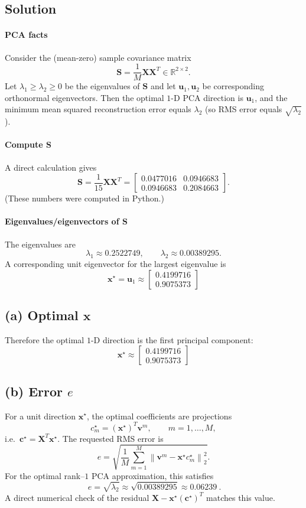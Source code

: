 \documentclass{article}
\begin{document}
\subsection*{Solution}

\paragraph{PCA facts}
Consider the (mean-zero) sample covariance matrix
\[
\mathbf S=\frac{1}{M}\mathbf X\mathbf X^T\in\mathbb R^{2\times 2}.
\]
Let $\lambda_1\ge \lambda_2\ge 0$ be the eigenvalues of $\mathbf S$ and let $\mathbf u_1,\mathbf u_2$ be corresponding
orthonormal eigenvectors.  Then the optimal $1$-D PCA direction is $\mathbf u_1$, and the minimum mean squared
reconstruction error equals $\lambda_2$ (so RMS error equals $\sqrt{\lambda_2}$).

\paragraph{Compute $\mathbf S$}
A direct calculation gives
\[
\mathbf S=\frac{1}{15}\mathbf X\mathbf X^T
=
\begin{bmatrix}
0.0477016 & 0.0946683\\
0.0946683 & 0.2084663
\end{bmatrix}.
\]
(These numbers were computed in Python.) 

\paragraph{Eigenvalues/eigenvectors of $\mathbf S$}
The eigenvalues are
\[
\boxed{\lambda_1\approx 0.2522749,\qquad \lambda_2\approx 0.00389295.}
\]
A corresponding unit eigenvector for the largest eigenvalue is
\[
\boxed{
\mathbf x^\star=\mathbf u_1\approx
\begin{bmatrix}
0.4199716\\
0.9075373
\end{bmatrix}
}
\]


\subsection*{(a) Optimal $\mathbf x$}
Therefore the optimal $1$-D direction is the first principal component:
\[
\boxed{\ \mathbf x^\star\approx
\begin{bmatrix}
0.4199716\\
0.9075373
\end{bmatrix}\ }
\]

\subsection*{(b) Error $e$}
For a unit direction $\mathbf x^\star$, the optimal coefficients are projections
\[
c_m^\star=(\mathbf x^\star)^T\mathbf v^m,\qquad m=1,\dots,M,
\]
i.e.\ $\mathbf c^\star=\mathbf X^T\mathbf x^\star$.
The requested RMS error is
\[
e=\sqrt{\frac{1}{M}\sum_{m=1}^M \left\|\mathbf v^m-\mathbf x^\star c_m^\star\right\|_2^2}.
\]
For the optimal rank--$1$ PCA approximation, this satisfies
\[
\boxed{\ e=\sqrt{\lambda_2}\approx \sqrt{0.00389295}\approx 0.06239\ }.
\]
A direct numerical check of the residual $\mathbf X-\mathbf x^\star(\mathbf c^\star)^T$ matches this value.
\end{document}
